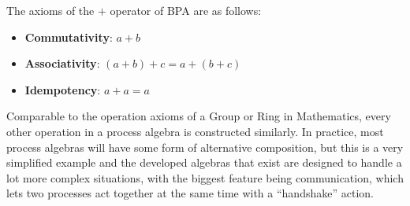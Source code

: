 \documentclass[../hons_project.tex]{subfiles}
\begin{document}
The axioms of the $+$ operator of BPA are as follows:
\begin{itemize}
    \item \textbf{Commutativity}: $a + b$
    \item \textbf{Associativity}: $(a + b) + c = a + (b + c)$
    \item \textbf{Idempotency}: $a + a = a$
\end{itemize}
Comparable to the operation axioms of a Group or Ring in Mathematics, every other operation in a process algebra is constructed similarly. In practice, most process algebras will have some form of alternative composition, but this is a very simplified example and the developed algebras that exist are designed to handle a lot more complex situations, with the biggest feature being communication, which lets two processes act together at the same time with a ``handshake'' action.
\end{document}
